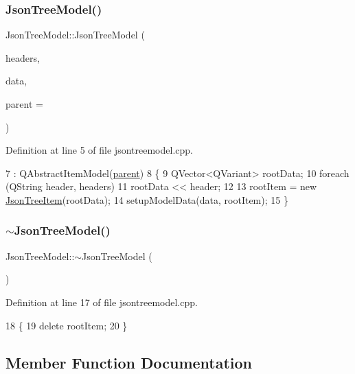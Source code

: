 \subsubsection{\texorpdfstring{Json\+Tree\+Model()}{JsonTreeModel()}}
{\footnotesize\ttfamily Json\+Tree\+Model\+::\+Json\+Tree\+Model (\begin{DoxyParamCaption}\item[{const Q\+String\+List \&}]{headers,  }\item[{const \hyperlink{class_json_1_1_value}{Json\+::\+Value} \&}]{data,  }\item[{Q\+Object $\ast$}]{parent = {} }\end{DoxyParamCaption})}



Definition at line 5 of file jsontreemodel.\+cpp.


\begin{DoxyCode}
7     : QAbstractItemModel(\hyperlink{class_json_tree_model_aea54120cdf66d49e8f0ad176eed8fc99}{parent})
8 \{
9     QVector<QVariant> rootData;
10     \textcolor{keywordflow}{foreach} (QString header, headers)
11         rootData << header;
12 
13     rootItem = \textcolor{keyword}{new} \hyperlink{class_json_tree_item}{JsonTreeItem}(rootData);
14     setupModelData(data, rootItem);
15 \}
\end{DoxyCode}
\mbox{\label{class_json_tree_model_aa727dca0c93d6a6dd5ff01fad68b4d13}} 
\subsubsection{\texorpdfstring{$\sim$\+Json\+Tree\+Model()}{~JsonTreeModel()}}
{\footnotesize\ttfamily Json\+Tree\+Model\+::$\sim$\+Json\+Tree\+Model (\begin{DoxyParamCaption}{ }\end{DoxyParamCaption})}



Definition at line 17 of file jsontreemodel.\+cpp.


\begin{DoxyCode}
18 \{
19     \textcolor{keyword}{delete} rootItem;
20 \}
\end{DoxyCode}


\subsection{Member Function Documentation}
\mbox{\label{class_json_tree_model_a65c133944c24a5121f8a4f89775e18a6}} 
